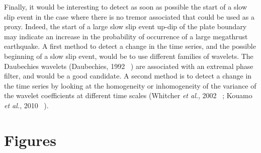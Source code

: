 \documentclass[letterpaper, 12pt]{article}
\begin{document}
Finally, it would be interesting to detect as soon as possible the start of a slow slip event in the case where there is no tremor associated that could be used as a proxy. Indeed, the start of a large slow slip event up-dip of the plate boundary may indicate an increase in the probability of occurrence of a large megathrust earthquake. A first method to detect a change in the time series, and the possible beginning of a slow slip event, would be to use different families of wavelets. The Daubechies wavelets (Daubechies, 1992 ~\cite{DAU_1992}) are associated with an extremal phase filter, and would be a good candidate. A second method is to detect a change in the time series by looking at the homogeneity or inhomogeneity of the variance of the wavelet coefficients at different time scales (Whitcher \textit{et al.}, 2002 ~\cite{WHI_2002}; Kouamo \textit{et al.}, 2010 ~\cite{KOU_2010}).

\newpage
\setcounter{page}{1}




\newpage
\setcounter{page}{1}

\section*{Figures}
\end{document}
